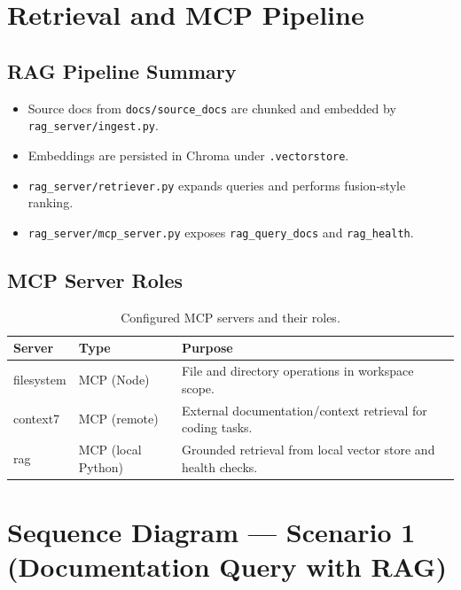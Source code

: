 \documentclass[11pt, letterpaper]{article}
\begin{document}
\section{Retrieval and MCP Pipeline}

\subsection{RAG Pipeline Summary}

\begin{itemize}
    \item Source docs from \texttt{docs/source\_docs} are chunked and embedded by \texttt{rag\_server/ingest.py}.
    \item Embeddings are persisted in Chroma under \texttt{.vectorstore}.
    \item \texttt{rag\_server/retriever.py} expands queries and performs fusion-style ranking.
    \item \texttt{rag\_server/mcp\_server.py} exposes \texttt{rag\_query\_docs} and \texttt{rag\_health}.
\end{itemize}

\subsection{MCP Server Roles}

\begin{table}[H]
\centering\small
\begin{tabularx}{\textwidth}{@{}l l X@{}}
\toprule
\textbf{Server} & \textbf{Type} & \textbf{Purpose} \\
\midrule
filesystem & MCP (Node) & File and directory operations in workspace scope. \\
context7 & MCP (remote) & External documentation/context retrieval for coding tasks. \\
rag & MCP (local Python) & Grounded retrieval from local vector store and health checks. \\
\bottomrule
\end{tabularx}
\caption{Configured MCP servers and their roles.}
\end{table}

\section{Sequence Diagram --- Scenario 1 (Documentation Query with RAG)}
\end{document}
